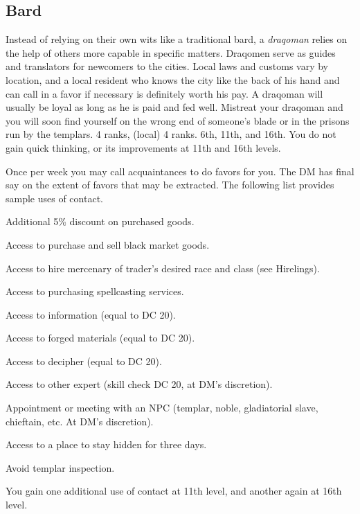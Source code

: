\subsection{Bard}
{Instead of relying on their own wits like a traditional bard, a \emph{draqoman} relies on the help of others more capable in specific matters. Draqomen serve as guides and translators for newcomers to the cities. Local laws and customs vary by location, and a local resident who knows the city like the back of his hand and can call in a favor if necessary is definitely worth his pay. A draqoman will usually be loyal as long as he is paid and fed well. Mistreat your draqoman and you will soon find yourself on the wrong end of someone’s blade or in the prisons run by the templars.}
{ 4 ranks,  (local) 4 ranks.}
{6th, 11th, and 16th.}
{You do not gain quick thinking, or its improvements at 11th and 16th levels.}
{
	Once per week you may call acquaintances to do favors for you. The DM has final say on the extent of favors that may be extracted. The following list provides sample uses of contact.

\begin{itemize*}
\item Additional 5\% discount on purchased goods.
\item Access to purchase and sell black market goods.
\item Access to hire mercenary of trader's desired race and class (see Hirelings).
\item Access to purchasing spellcasting services.
\item Access to information (equal to  DC 20).
\item Access to forged materials (equal to  DC 20).
\item Access to decipher (equal to  DC 20).
\item Access to other expert (skill check DC 20, at DM's discretion).
\item Appointment or meeting with an NPC (templar, noble, gladiatorial slave, chieftain, etc. At DM's discretion).
\item Access to a place to stay hidden for three days.
\item Avoid templar inspection.
\end{itemize*}

	You gain one additional use of contact at 11th level, and another again at 16th level.
}

